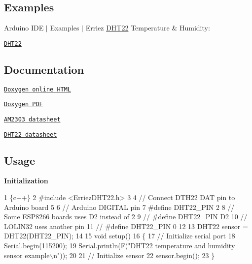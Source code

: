 \subsection*{Examples}

Arduino I\+DE $\vert$ Examples $\vert$ Erriez \hyperlink{class_d_h_t22}{D\+H\+T22} Temperature \& Humidity\+:


\begin{DoxyItemize}
\item \href{https://github.com/Erriez/ErriezDHT22/blob/master/examples/DHT22/DHT22.ino}{\tt D\+H\+T22}
\end{DoxyItemize}

\subsection*{Documentation}


\begin{DoxyItemize}
\item \href{https://erriez.github.io/ErriezDHT22}{\tt Doxygen online H\+T\+ML}
\item \href{https://github.com/Erriez/ErriezDHT22/raw/gh-pages/latex/ErriezDHT22.pdf}{\tt Doxygen P\+DF}
\item \href{https://raw.githubusercontent.com/Erriez/ErriezDHT22/master/extras/AM2303_datasheet.pdf}{\tt A\+M2303 datasheet}
\item \href{https://www.google.com/search?q=DHT22+datasheet}{\tt D\+H\+T22 datasheet}
\end{DoxyItemize}

\subsection*{Usage}

{\bfseries Initialization}


\begin{DoxyCode}
1 \{c++\}
2 #include <ErriezDHT22.h>
3 
4 // Connect DTH22 DAT pin to Arduino board
5 
6 // Arduino DIGITAL pin
7 #define DHT22\_PIN      2
8 // Some ESP8266 boards uses D2 instead of 2
9 // #define DHT22\_PIN   D2
10 // LOLIN32 uses another pin
11 // #define DHT22\_PIN   0
12 
13 DHT22 sensor = DHT22(DHT22\_PIN);
14 
15 void setup()
16 \{
17     // Initialize serial port
18     Serial.begin(115200);
19     Serial.println(F("DHT22 temperature and humidity sensor example\(\backslash\)n"));
20 
21     // Initialize sensor
22     sensor.begin();
23 \}
\end{DoxyCode}


